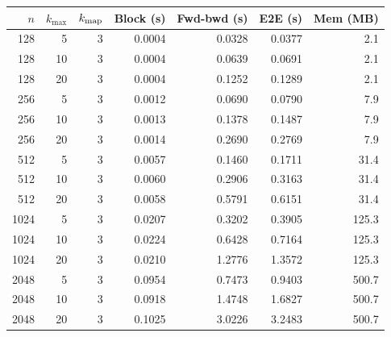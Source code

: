 \begin{table}[!htbp]
\centering
\label{tab:E10-scaling-paper}
\begin{tabular}{rrrrrrr}
\toprule
$n$ & $k_{\max}$ & $k_{\rm map}$ & Block (s) & Fwd-bwd (s) & E2E (s) & Mem (MB)\\
\midrule
128 & 5 & 3 & 0.0004 & 0.0328 & 0.0377 & 2.1\\
128 & 10 & 3 & 0.0004 & 0.0639 & 0.0691 & 2.1\\
128 & 20 & 3 & 0.0004 & 0.1252 & 0.1289 & 2.1\\
256 & 5 & 3 & 0.0012 & 0.0690 & 0.0790 & 7.9\\
256 & 10 & 3 & 0.0013 & 0.1378 & 0.1487 & 7.9\\
256 & 20 & 3 & 0.0014 & 0.2690 & 0.2769 & 7.9\\
512 & 5 & 3 & 0.0057 & 0.1460 & 0.1711 & 31.4\\
512 & 10 & 3 & 0.0060 & 0.2906 & 0.3163 & 31.4\\
512 & 20 & 3 & 0.0058 & 0.5791 & 0.6151 & 31.4\\
1024 & 5 & 3 & 0.0207 & 0.3202 & 0.3905 & 125.3\\
1024 & 10 & 3 & 0.0224 & 0.6428 & 0.7164 & 125.3\\
1024 & 20 & 3 & 0.0210 & 1.2776 & 1.3572 & 125.3\\
2048 & 5 & 3 & 0.0954 & 0.7473 & 0.9403 & 500.7\\
2048 & 10 & 3 & 0.0918 & 1.4748 & 1.6827 & 500.7\\
2048 & 20 & 3 & 0.1025 & 3.0226 & 3.2483 & 500.7\\
\bottomrule
\end{tabular}
\end{table}
